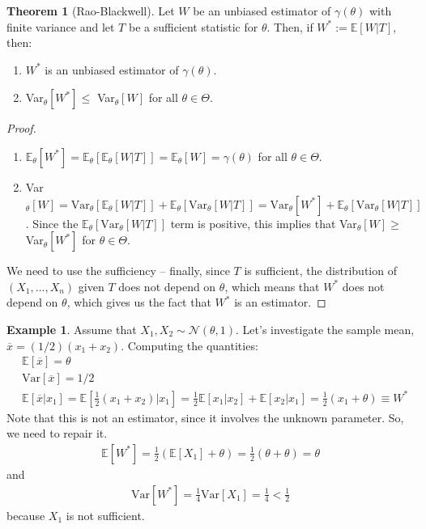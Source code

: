 \documentclass[11pt]{scrartcl}
\theoremstyle{definition}
\newtheorem{theorem}{Theorem}
\newtheorem{ex}{Example}
\theoremstyle{remark}
\newcommand{\EX}[1]{\mathbb{E}\left[#1 \right]}
\newcommand{\EXth}[1]{\mathbb{E}_\theta \left[ #1 \right]}
\begin{document}
{\begin{theorem}[Rao-Blackwell]
	Let $W$ be an unbiased estimator of $\gamma(\theta)$ with finite variance and let $T$ be a sufficient statistic for $\theta$. Then, if $W^* := \EX{W|T}$, then: 
	\begin{enumerate}[noitemsep]
		\item $W^*$ is an unbiased estimator of $\gamma(\theta)$. 
		\item Var$_\theta[W^*] \leq$ Var$_\theta[W]$ for all $ \theta \in \Theta$. 
	\end{enumerate}
\end{theorem}

\begin{proof}
	\begin{enumerate}[noitemsep]
		\item $\EXth{W^*} = \EXth{\EXth{W|T}} = \EXth{W} = \gamma(\theta)$ for all $\theta \in \Theta$. 
		\item Var$_\theta [W] = \text{Var}_\theta [\EXth{W|T}] + \EXth{\text{Var}_\theta [W|T]} = \text{Var}_\theta [W^*] + \EXth{\text{Var}_\theta [W|T]}$. Since the $\EXth{\text{Var}_\theta [W|T]}$ term is positive, this implies that Var$_\theta [W] \geq $ Var$_\theta [W^*]$ for $\theta \in \Theta$. 
	\end{enumerate}
	We need to use the sufficiency -- finally, since $T$ is sufficient, the distribution of $(X_1, ..., X_n)$ given $T$ does not depend on $\theta$, which means that $W^*$ does not depend on $\theta$, which gives us the fact that $W^*$ is an estimator. 
\end{proof}

\begin{ex}
	Assume that $X_1, X_2 \sim \mathcal{N}( \theta, 1)$. Let's investigate the sample mean, $\overline{x} = (1/2)(x_1 + x_2)$. Computing the quantities: 
	\begin{align*}
		& \EX{\overline{x}} = \theta \\
		& \text{Var}[\overline{x}] = 1/2 \\
		& \EX{\overline{x} | x_1 } = \EX{\frac{1}{2} (x_1 + x_2) | x_1} = \frac{1}{2} \EX{x_1 | x_2} + \EX{x_2 | x_1}  = \frac{1}{2} (x_1 + \theta) \equiv W^*
	\end{align*}
	Note that this is not an estimator, since it involves the unknown parameter. So, we need to repair it. 
	\begin{align*}
		\EX{W^*} = \frac{1}{2} \left( \EX{X_1} + \theta \right) = \frac{1}{2} (\theta + \theta) = \theta 
	\end{align*}
	and 
	\begin{align*}
		\text{Var}[W^*] = \frac{1}{4} \text{Var}[X_1] = \frac{1}{4} < \frac{1}{2}
	\end{align*}
	because $X_1$ is not sufficient. 
\end{ex}

}
\end{document}
